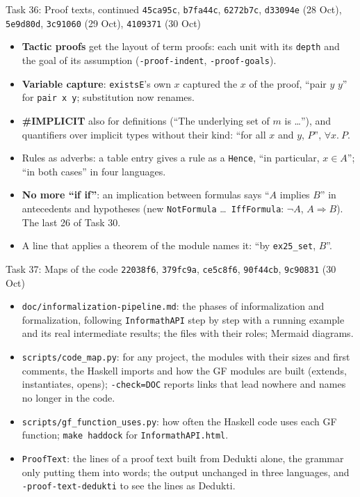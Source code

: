 \documentclass[10pt,aspectratio=169]{beamer}
\newcommand{\bad}[1]{\textcolor{warn}{#1}}
\newcommand{\ok}[1]{\textcolor{good}{#1}}
\newcommand{\commit}[1]{\texttt{\footnotesize #1}}
\begin{document}
\begin{frame}{Task 36: Proof texts, continued}
  \commit{45ca95c}, \commit{b7fa44c}, \commit{6272b7c}, \commit{d33094e} (28 Oct),
  \commit{5e9d80d}, \commit{3c91060} (29 Oct), \commit{4109371} (30 Oct)
  \begin{itemize}\small
    \item \textbf{Tactic proofs} get the layout of term proofs: each unit with its
          \texttt{depth} and the goal of its assumption (\texttt{-proof-indent},
          \texttt{-proof-goals}).
    \item \textbf{Variable capture}: \texttt{existsE}'s own $x$ captured the $x$ of the proof,
          \bad{``pair $y$ $y$''} for \texttt{pair x y}; substitution now renames.
    \item \textbf{\#IMPLICIT} also for definitions (``The underlying set of $m$ is \ldots''),
          and quantifiers over implicit types without their kind: \ok{``for all $x$ and $y$,
          $P$''}, $\forall x .\ P$.
    \item Rules as adverbs: a table entry gives a rule as a \texttt{Hence}, \ok{``in
          particular, $x \in A$''}; ``in both cases'' in four languages.
    \item \textbf{No more ``if if''}: an implication between formulas says \ok{``$A$ implies
          $B$''} in antecedents and hypotheses (new \texttt{NotFormula} \ldots\
          \texttt{IffFormula}: $\neg A$, $A \Rightarrow B$). The last 26 of Task 30.
    \item A line that applies a theorem of the module names it: ``by \texttt{ex25\_set}, $B$''.
  \end{itemize}
\end{frame}

\begin{frame}{Task 37: Maps of the code}
  \commit{22038f6}, \commit{379fc9a}, \commit{ce5c8f6}, \commit{90f44cb}, \commit{9c90831}
  (30 Oct)
  \begin{itemize}\small
    \item \texttt{doc/informalization-pipeline.md}: the phases of informalization and
          formalization, following \texttt{InformathAPI} step by step with a running example and
          its real intermediate results; the files with their roles; Mermaid diagrams.
    \item \texttt{scripts/code\_map.py}: for any project, the modules with their sizes and
          first comments, the Haskell imports and how the GF modules are built (extends,
          instantiates, opens); \texttt{-check=DOC} reports links that lead nowhere and names
          no longer in the code.
    \item \texttt{scripts/gf\_function\_uses.py}: how often the Haskell code uses each GF
          function; \texttt{make haddock} for \texttt{InformathAPI.html}.
    \item \texttt{ProofText}: the lines of a proof text built from Dedukti alone, the
          grammar only putting them into words; the output unchanged in three languages,
          and \texttt{-proof-text-dedukti} to see the lines as Dedukti.
  \end{itemize}
\end{frame}
\end{document}
